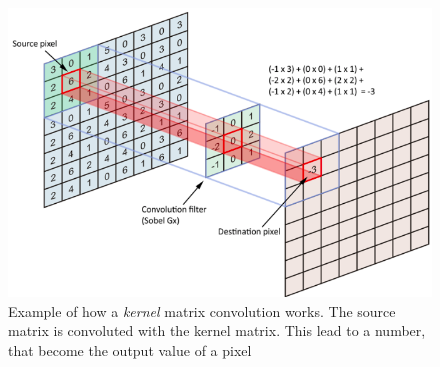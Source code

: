 \documentclass[12pt,a4paper,twocolumn]{article}
\begin{document}
				
			\begin{figure}[h!]
				\centering
				\includegraphics[width=0.7\linewidth]{images/kernel}
				\caption{Example of how a \emph{kernel} matrix convolution works. The source matrix is convoluted with the kernel matrix. This lead to a number, that become the output value of a pixel}
				\label{fig:kernel}
			\end{figure}
			
		\newpage
		
		\printbibliography
\end{document}
